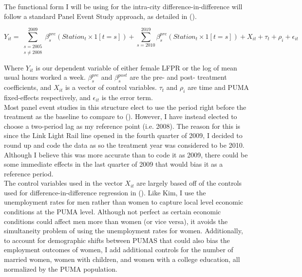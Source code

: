 \documentclass{article}
\begin{document}
The functional form I will be using for the intra-city difference-in-difference will follow a standard Panel Event Study approach, as detailed in \citeauthor{clarke_implementing_2020} (\citeyear{clarke_implementing_2020}).

\begin{equation}
\label{eqn}
Y_{it} = \sum^{2009}_{\substack{s=2005 \\ s\neq 2008}} \beta^{pre}_s(Station_t \times 1[t=s]) + \sum^{2019}_{s=2010}\beta^{pre}_s(Station_t \times 1[t=s]) + X_{it} + \tau_t + \rho_i + \epsilon_{it} 
\end{equation}

Where $Y_{it}$ is our dependent variable of either female LFPR or the log of mean usual hours worked a week. $\beta^{pre}_s$ and $\beta^{post}_s$ are the pre- and post- treatment coefficients, and $X_{it}$ is a vector of control variables. $\tau_t$ and $\rho_i$ are time and PUMA fixed-effects respectively, and $\epsilon_{it}$ is the error term. \\

Most panel event studies in this structure elect to use the period right before the treatment as the baseline to compare to (\cite{freyaldenhoven_visualization_2021}). However, I have instead elected to choose a two-period lag as my reference point (i.e. 2008). The reason for this is since the Link Light Rail line opened in the fourth quarter of 2009, I decided to round up and code the data as so the treatment year was considered to be 2010. Although I believe this was more accurate than to code it as 2009, there could be some immediate effects in the last quarter of 2009 that would bias it as a reference period. \\

The control variables used in the vector $X_{it}$ are largely based off of the controls used for difference-in-difference regression in \citeauthor{kim_subways_2019} (\citeyear{kim_subways_2019}). Like Kim, I use the unemployment rates for men rather than women to capture local level economic conditions at the PUMA level. Although not perfect as certain economic conditions could affect men more than women (or vice versa), it avoids the simultaneity problem of using the unemployment rates for women. Additionally, to account for demographic shifts between PUMAS that could also bias the employment outcomes of women, I add additional controls for the number of married women, women with children, and women with a college education, all normalized by the PUMA population. \\
\end{document}
